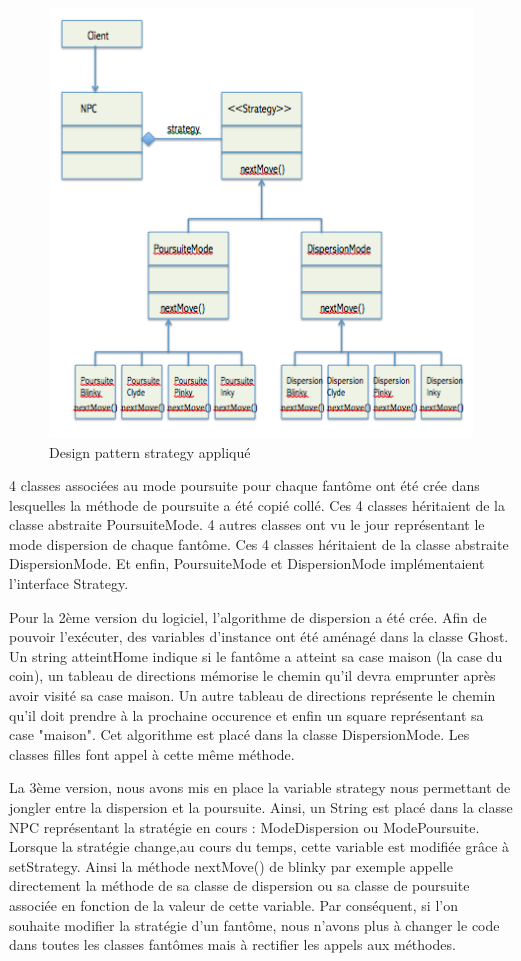 \documentclass[a4paper,12pt]{report} %
\begin{document}
\begin{figure}[!h] %
		\centering
		\includegraphics[scale=0.9]{ressources/StrategyDP.png}
		\caption{Design pattern strategy appliqué}
\end{figure}


4 classes associées au mode poursuite pour chaque fantôme ont été crée dans lesquelles la méthode de poursuite a été copié collé. Ces 4 classes héritaient de la classe abstraite PoursuiteMode.
4 autres classes ont vu le jour représentant le mode dispersion de chaque fantôme.
Ces 4 classes héritaient de la classe abstraite DispersionMode.
Et enfin, PoursuiteMode et DispersionMode implémentaient l'interface Strategy.

Pour la 2ème version du logiciel, l'algorithme de dispersion a été crée.
Afin de pouvoir l'exécuter, des variables d'instance ont été aménagé dans la classe Ghost. Un string atteintHome indique si le fantôme a atteint sa case maison (la case du coin), un tableau de directions mémorise le chemin qu'il devra emprunter après avoir visité sa case maison. Un autre tableau de directions représente le chemin qu'il doit prendre à la prochaine occurence et enfin un square représentant sa case "maison".
Cet algorithme est placé dans la classe DispersionMode. Les classes filles font appel à cette même méthode.

La 3ème version, nous avons mis en place la variable strategy nous permettant de jongler entre la dispersion et la poursuite.
Ainsi, un String est placé dans la classe NPC représentant la stratégie en cours : ModeDispersion ou ModePoursuite. Lorsque la stratégie change,au cours du temps, cette variable est modifiée grâce à setStrategy.
Ainsi la méthode nextMove() de blinky par exemple appelle directement la méthode de sa classe de dispersion ou sa classe de poursuite associée en fonction de la valeur de cette variable.
Par conséquent, si l'on souhaite modifier la stratégie d'un fantôme, nous n'avons plus à changer le code dans toutes les classes fantômes mais à rectifier les appels aux méthodes.
\end{document}
